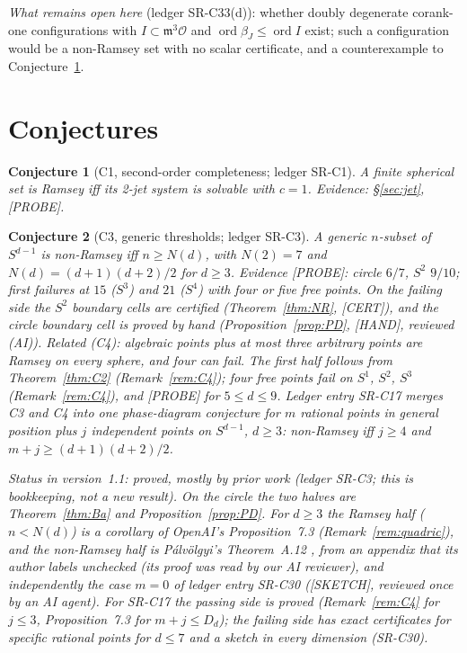 \documentclass[11pt]{amsart}
\newcommand{\st}[1]{\textsf{[#1]}}
\theoremstyle{plain}
\newtheorem{conjecture}{Conjecture}
\theoremstyle{definition}
\begin{document}
\noindent\emph{What remains open here} (ledger SR-C33(d)): whether doubly degenerate corank-one
configurations with $I\subset\mathfrak m^3\mathcal O$ and $\operatorname{ord}\beta_J\le\operatorname{ord}I$
exist; such a configuration would be a non-Ramsey set with no scalar certificate, and a counterexample to
Conjecture~\ref{conj:C1}.

\section{Conjectures}\label{sec:conj}

\begin{conjecture}[C1, second-order completeness; ledger SR-C1]\label{conj:C1}
A finite spherical set is Ramsey iff its 2-jet system is solvable with $c=1$. Evidence:
\S\ref{sec:jet}, \st{PROBE}.
\end{conjecture}

\begin{conjecture}[C3, generic thresholds; ledger SR-C3]\label{conj:C3}
A generic $n$-subset of $S^{d-1}$ is non-Ramsey iff $n\ge N(d)$, with $N(2)=7$ and $N(d)=(d+1)(d+2)/2$ for
$d\ge3$. Evidence \st{PROBE}: circle $6/7$, $S^2$ $9/10$; first failures at $15$ ($S^3$) and $21$ ($S^4$)
with four or five free points. On the failing side the $S^2$ boundary cells are certified (Theorem~\ref{thm:NR}, \st{CERT}),
and the circle boundary cell is proved by hand (Proposition~\ref{prop:PD}, \st{HAND}, reviewed (AI)). Related (C4): algebraic points plus at most three
arbitrary points are Ramsey on every sphere, and four can fail. The first half follows from
Theorem~\ref{thm:C2} (Remark~\ref{rem:C4}); four free points fail on $S^1$, $S^2$, $S^3$
(Remark~\ref{rem:C4}), and \st{PROBE} for $5\le d\le9$. Ledger entry SR-C17 merges C3 and C4 into one
phase-diagram conjecture for $m$ rational points in general position plus $j$ independent points on
$S^{d-1}$, $d\ge3$: non-Ramsey iff $j\ge4$ and $m+j\ge(d+1)(d+2)/2$.

\emph{Status in version~1.1: proved, mostly by prior work} (ledger SR-C3; this is bookkeeping, not a new
result). On the circle the two halves are Theorem~\ref{thm:Ba} and Proposition~\ref{prop:PD}. For
$d\ge3$ the Ramsey half ($n<N(d)$) is a corollary of OpenAI's Proposition~7.3
(Remark~\ref{rem:quadric}), and the non-Ramsey half is P\'alv\"olgyi's Theorem~A.12 \cite{Palvolgyi},
from an appendix that its author labels unchecked (its proof was read by our AI reviewer), and
independently the case $m=0$ of ledger entry SR-C30 (\st{SKETCH}, reviewed once by an AI agent). For
SR-C17 the passing side is proved (Remark~\ref{rem:C4} for $j\le3$, Proposition~7.3 for $m+j\le D_d$);
the failing side has exact certificates for specific rational points for $d\le7$ and a sketch in every
dimension (SR-C30).
\end{conjecture}
\end{document}
